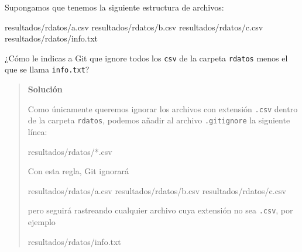 \documentclass[
  spanish,
  12pt,
  letterpaper,
  DIV=11,
  numbers=noendperiod]{scrreprt}
\newenvironment{Shaded}{\begin{snugshade}}{\end{snugshade}}
\newcommand{\ExtensionTok}[1]{\textcolor[rgb]{0.00,0.23,0.31}{#1}}
\newcommand{\NormalTok}[1]{\textcolor[rgb]{0.00,0.23,0.31}{#1}}
\begin{document}
\begin{tcolorbox}[enhanced jigsaw, arc=.35mm, bottomrule=.15mm, bottomtitle=1mm, breakable, colback=white, colbacktitle=quarto-callout-note-color!10!white, colframe=quarto-callout-note-color-frame, coltitle=black, left=2mm, leftrule=.75mm, opacityback=0, opacitybacktitle=0.6, rightrule=.15mm, title=\textcolor{quarto-callout-note-color}{\faInfo}\hspace{0.5em}{Ejercicio 3}, titlerule=0mm, toprule=.15mm, toptitle=1mm]

Supongamos que tenemos la siguiente estructura de archivos:

\begin{Shaded}
\begin{Highlighting}[]
\ExtensionTok{resultados/rdatos/a.csv}
\ExtensionTok{resultados/rdatos/b.csv}
\ExtensionTok{resultados/rdatos/c.csv}
\ExtensionTok{resultados/rdatos/info.txt}
\end{Highlighting}
\end{Shaded}

¿Cómo le indicas a Git que ignore todos los \texttt{csv} de la carpeta
\texttt{rdatos} menos el que se llama \texttt{info.txt}?

\begin{quote}
\textbf{Solución}

Como únicamente queremos ignorar los archivos con extensión
\texttt{.csv} dentro de la carpeta \texttt{rdatos}, podemos añadir al
archivo \texttt{.gitignore} la siguiente línea:

\begin{Shaded}
\begin{Highlighting}[]
\NormalTok{resultados/rdatos/*.csv}
\end{Highlighting}
\end{Shaded}

Con esta regla, Git ignorará

\begin{Shaded}
\begin{Highlighting}[]
\NormalTok{resultados/rdatos/a.csv}
\NormalTok{resultados/rdatos/b.csv}
\NormalTok{resultados/rdatos/c.csv}
\end{Highlighting}
\end{Shaded}

pero seguirá rastreando cualquier archivo cuya extensión no sea
\texttt{.csv}, por ejemplo

\begin{Shaded}
\begin{Highlighting}[]
\NormalTok{resultados/rdatos/info.txt}
\end{Highlighting}
\end{Shaded}


\end{quote}
\end{tcolorbox}
\end{document}
